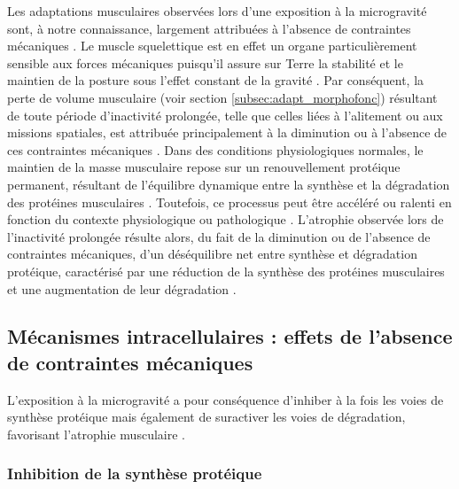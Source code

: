 \documentclass[11pt]{report}
\begin{document}
Les adaptations musculaires observées lors d'une exposition à la microgravité sont, à notre connaissance, largement attribuées à l'absence de contraintes mécaniques \parencite{bonanni_microgravity_2023, bosutti_microgravity-induced_2025, williams_acclimation_2009}. Le muscle squelettique est en effet un organe particulièrement sensible aux forces mécaniques \parencite{Roberts2023Oct,Jorgenson2024Mar} puisqu'il assure sur Terre la stabilité et le maintien de la posture sous l'effet constant de la gravité \parencite{liu_mechanisms_2024}. Par conséquent, la perte de volume musculaire (voir section \ref{subsec:adapt_morphofonc}) résultant de toute période d'inactivité prolongée, telle que celles liées à l'alitement ou aux missions spatiales, est attribuée principalement à la diminution ou à l'absence de ces contraintes mécaniques \parencite{Gao2018Mar}. Dans des conditions physiologiques normales, le maintien de la masse musculaire repose sur un renouvellement protéique permanent, résultant de l'équilibre dynamique entre la synthèse et la dégradation des protéines musculaires \parencite{Mitchell2016Jul,Poortmans2012Oct}. Toutefois, ce processus peut être accéléré ou ralenti en fonction du contexte physiologique ou pathologique \parencite{Bonaldo2013Jan}. L'atrophie observée lors de l'inactivité prolongée résulte alors, du fait de la diminution ou de l'absence de contraintes mécaniques, d'un déséquilibre net entre synthèse et dégradation protéique, caractérisé par une réduction de la synthèse des protéines musculaires et une augmentation de leur dégradation \parencite{bosutti_microgravity-induced_2025,liu_mechanisms_2024}. 

\subsection{Mécanismes intracellulaires : effets de l'absence de contraintes mécaniques}

L'exposition à la microgravité a pour conséquence d'inhiber à la fois les voies de synthèse protéique mais également de suractiver les voies de dégradation, favorisant l'atrophie musculaire \parencite{liu_mechanisms_2024,bosutti_microgravity-induced_2025}.

\subsubsection{Inhibition de la synthèse protéique}
\label{subsec:inhibsynthprot}
\end{document}

